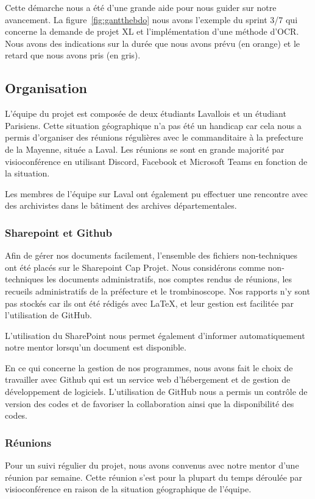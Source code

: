 Cette démarche nous a été d’une grande aide pour nous guider sur notre avancement.
La figure~\ref{fig:gantthebdo} nous avons l'exemple du sprint 3/7 qui concerne la demande de projet XL et l'implémentation d'une méthode d'OCR\@. 
Nous avons des indications sur la durée que nous avons prévu (en orange) et le retard que nous avons pris (en gris). 


\subsection{Organisation}
L'équipe du projet est composée de deux étudiants Lavallois et un étudiant Parisiens.
Cette situation géographique n'a pas été un handicap car cela nous a permis d'organiser des réunions régulières avec le commanditaire à la prefecture de la Mayenne, située a Laval. 
Les réunions se sont en grande majorité par visioconférence en utilisant Discord, Facebook et Microsoft Teams en fonction de la situation.

Les membres de l'équipe sur Laval ont également pu effectuer une rencontre avec des archivistes dans le bâtiment des archives départementales.

\subsubsection{Sharepoint et Github}
Afin de gérer nos documents facilement, l'ensemble des fichiers non-techniques ont été placés sur le Sharepoint Cap Projet.
Nous considérons comme non-techniques les documents administratifs, nos comptes rendus de réunions, les recueils administratifs de la préfecture et le trombinoscope.
Nos rapports n'y sont pas stockés car ils ont été rédigés avec \LaTeX, et leur gestion est facilitée par l'utilisation de GitHub.

L'utilisation du SharePoint nous permet également d’informer automatiquement notre mentor lorsqu'un document est disponible. 

En ce qui concerne la gestion de nos programmes, nous avons fait le choix de travailler avec Github qui est un service web d'hébergement et de gestion de développement de logiciels.
L'utilisation de GitHub nous a permis un contrôle de version des codes et de favoriser la collaboration ainsi que la disponibilité des codes. 


\subsubsection{Réunions}
Pour un suivi régulier du projet, nous avons convenus avec notre mentor d'une réunion par semaine.
Cette réunion s'est pour la plupart du temps déroulée par visioconférence en raison de la situation géographique de l'équipe.

